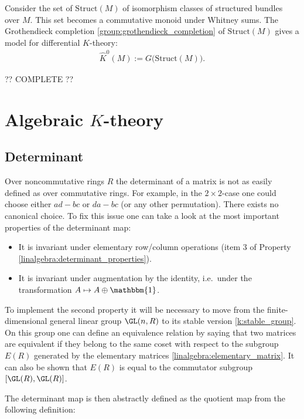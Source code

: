 {{        Consider the set of $\mathrm{Struct}(M)$ of isomorphism classes of structured bundles over $M$. This set becomes a commutative monoid under Whitney sums. The Grothendieck completion \ref{group:grothendieck_completion} of $\mathrm{Struct}(M)$ gives a model for differential $K$-theory:
        \begin{gather}
            \widehat{K}^0(M) := G\big(\mathrm{Struct}(M)\big).
        \end{gather}
    }

    ?? COMPLETE ??

\section{\texorpdfstring{Algebraic $K$-theory}{Algebraic K-theory}}
\subsection{Determinant}

    Over noncommutative rings $R$ the determinant of a matrix is not as easily defined as over commutative rings. For example, in the $2\times2$-case one could choose either $ad-bc$ or $da-bc$ (or any other permutation). There exists no canonical choice. To fix this issue one can take a look at the most important properties of the determinant map:
    \begin{itemize}
        \item It is invariant under elementary row/column operations (item 3 of Property \ref{linalgebra:determinant_properties}).
        \item It is invariant under augmentation by the identity, i.e.~under the transformation $A\mapsto A\oplus\mathbbm{1}$.
    \end{itemize}
    To implement the second property it will be necessary to move from the finite-dimensional general linear group $\GL(n,R)$ to its stable version \ref{k:stable_group}. On this group one can define an equivalence relation by saying that two matrices are equivalent if they belong to the same coset with respect to the subgroup $E(R)$ generated by the elementary matrices \ref{linalgebra:elementary_matrix}. It can also be shown that $E(R)$ is equal to the commutator subgroup $[\GL(R),\GL(R)]$.

    The determinant map is then abstractly defined as the quotient map from the following definition:

}
